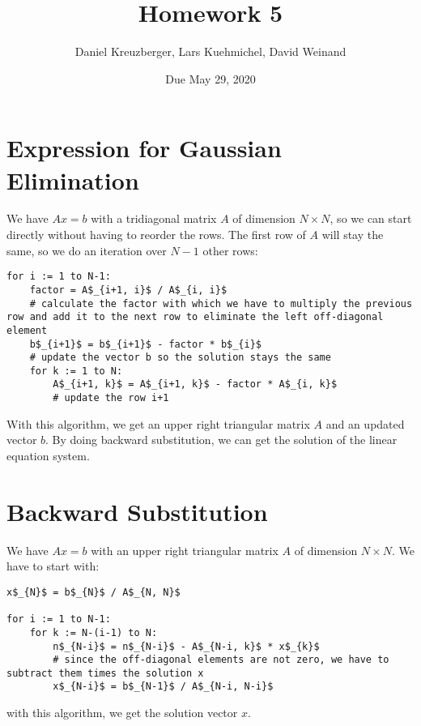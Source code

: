 \documentclass[11pt, a4paper]{article}
\title{Homework 5}
\date{Due May 29, 2020}
\author{Daniel Kreuzberger, Lars Kuehmichel, David Weinand}
\begin{document}
\maketitle
\section{Expression for Gaussian Elimination}
We have $Ax = b$ with a tridiagonal matrix $A$ of dimension $N \times N$, so we can start directly without having to reorder the rows. The first row of $A$ will stay the same, so we do an iteration over $N-1$ other rows:

\begin{lstlisting}
for i := 1 to N-1:
    factor = A$_{i+1, i}$ / A$_{i, i}$
    # calculate the factor with which we have to multiply the previous row and add it to the next row to eliminate the left off-diagonal element
    b$_{i+1}$ = b$_{i+1}$ - factor * b$_{i}$
    # update the vector b so the solution stays the same
    for k := 1 to N:
        A$_{i+1, k}$ = A$_{i+1, k}$ - factor * A$_{i, k}$
        # update the row i+1
\end{lstlisting}

With this algorithm, we get an upper right triangular matrix $A$ and an updated vector $b$. By doing backward substitution, we can get the solution of the linear equation system.
\newpage
\section{Backward Substitution}
We have $Ax = b$ with an upper right triangular matrix $A$ of dimension $N \times N$. We have to start with:
\begin{lstlisting}
x$_{N}$ = b$_{N}$ / A$_{N, N}$

for i := 1 to N-1:
    for k := N-(i-1) to N:
        n$_{N-i}$ = n$_{N-i}$ - A$_{N-i, k}$ * x$_{k}$
        # since the off-diagonal elements are not zero, we have to subtract them times the solution x
        x$_{N-i}$ = b$_{N-1}$ / A$_{N-i, N-i}$
\end{lstlisting}

with this algorithm, we get the solution vector $x$.
\end{document}
